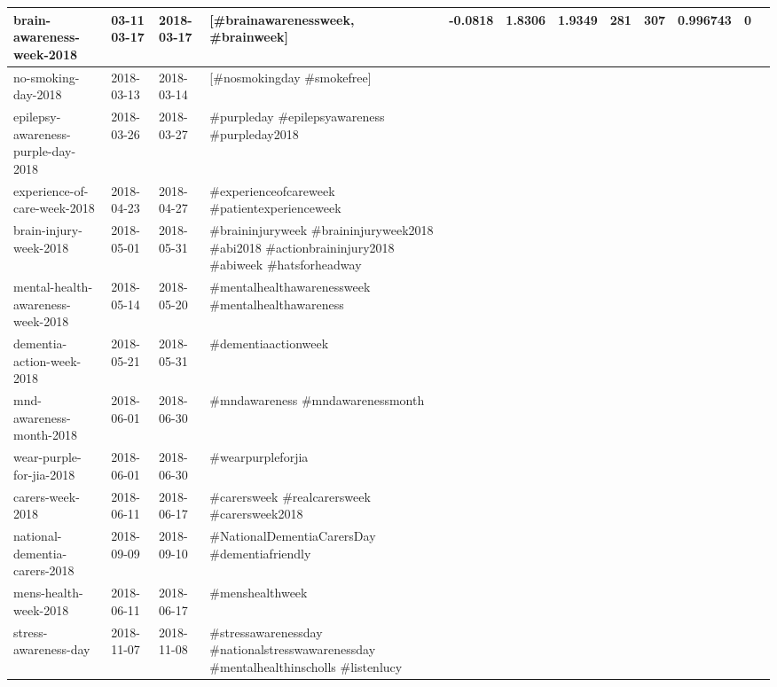 \documentclass[runningheads]{llncs}
\begin{document}
\begin{table}
{\begin{tabularx}{\textwidth}{|X|X|X|p{2.5cm}|X|X|X|X|X|X|X|X|}
			\hline 
			\rule[-1ex]{0pt}{2.5ex}  brain-awareness-week-2018	& 03-11	03-17	& 2018-03-17 &	[\#brainawarenessweek, \#brainweek]& -0.0818	 &  1.8306	& 1.9349	& 281	& 307	& 0.996743 & 0 & \\
			\hline 
						\rule[-1ex]{0pt}{2.5ex}  no-smoking-day-2018 & 2018-03-13  & 2018-03-14 & [\#nosmokingday \#smokefree]    & & & & & \\ 
			\hline 
			\rule[-1ex]{0pt}{2.5ex}  epilepsy-awareness-purple-day-2018 & 2018-03-26  & 2018-03-27 & \#purpleday \#epilepsyawareness \#purpleday2018    & & & & & \\ 
			\hline 
			\rule[-1ex]{0pt}{2.5ex}  experience-of-care-week-2018 & 2018-04-23  & 2018-04-27 & \#experienceofcareweek \#patientexperienceweek    & & & & & \\ 
			\hline 
			\rule[-1ex]{0pt}{2.5ex}  brain-injury-week-2018               & 2018-05-01  & 2018-05-31 & \#braininjuryweek \#braininjuryweek2018 \#abi2018 \#actionbraininjury2018 \#abiweek \#hatsforheadway    & & & & & \\ 
			\hline 
			\rule[-1ex]{0pt}{2.5ex}  mental-health-awareness-week-2018    & 2018-05-14  & 2018-05-20 & \#mentalhealthawarenessweek \#mentalhealthawareness      & & & & & \\ 
			\hline 
			\rule[-1ex]{0pt}{2.5ex}  dementia-action-week-2018  & 2018-05-21  & 2018-05-31 & \#dementiaactionweek      & & & & & \\ 
			\hline 
			\rule[-1ex]{0pt}{2.5ex}  mnd-awareness-month-2018 & 2018-06-01  & 2018-06-30 & \#mndawareness \#mndawarenessmonth         & & & & & \\ 
			\hline
			\rule[-1ex]{0pt}{2.5ex}   wear-purple-for-jia-2018             & 2018-06-01  & 2018-06-30 & \#wearpurpleforjia         & & & & & \\ 
			\hline 
			\rule[-1ex]{0pt}{2.5ex}   carers-week-2018                     & 2018-06-11  & 2018-06-17 & \#carersweek \#realcarersweek \#carersweek2018        & & & & & \\ 
			\hline 
			\rule[-1ex]{0pt}{2.5ex}  national-dementia-carers-2018        & 2018-09-09  & 2018-09-10 & \#NationalDementiaCarersDay \#dementiafriendly           & & & & & \\ 
			\hline 
			\rule[-1ex]{0pt}{2.5ex}  mens-health-week-2018                & 2018-06-11  & 2018-06-17 & \#menshealthweek           & & & & & \\ 
			\hline 
			\rule[-1ex]{0pt}{2.5ex}  stress-awareness-day                 & 2018-11-07  & 2018-11-08 & \#stressawarenessday \#nationalstresswawarenessday \#mentalhealthinscholls \#listenlucy             & & & & & \\ 

\end{tabularx}}
\end{table}
\end{document}
